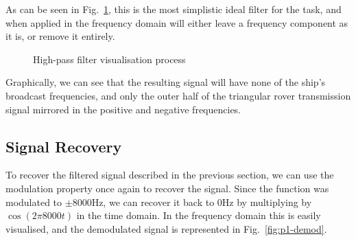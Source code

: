 \documentclass[12pt]{article}
\numberwithin{equation}{section}
\numberwithin{figure}{section}
\numberwithin{table}{section}
\begin{document}
As can be seen in Fig.~\ref{fig:p1-filter}, this is the most simplistic ideal
filter for the task, and when applied in the frequency domain will either leave
a frequency component as it is, or remove it entirely.

\begin{figure}[ht]
    \centering
    \caption{High-pass filter visualisation process\label{fig:p1-filter}}
\end{figure}

Graphically, we can see that the resulting signal will have none of the ship's
broadcast frequencies, and only the outer half of the triangular rover
transmission signal mirrored in the positive and negative frequencies.
\pagebreak
\subsection{Signal Recovery}
To recover the filtered signal described in the previous section, we can use
the modulation property once again to recover the signal. Since the function
was modulated to $\pm 8000$Hz, we can recover it back to $0$Hz by multiplying
by $\cos(2\pi 8000t)$ in the time domain. In the frequency domain this is
easily visualised, and the demodulated signal is represented in
Fig.~\ref{fig:p1-demod}.
\end{document}
